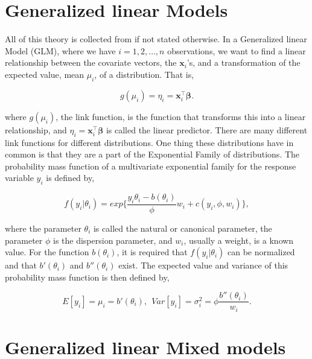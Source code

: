 
\section{Generalized linear Models}

\noindent All of this theory is collected from \cite{regression} if not stated otherwise. In a Generalized linear Model (GLM), where we have $i = 1, 2, \dots, n$ observations, we want to find a linear relationship between the covariate vectors, the $\mathbf{x}_i$'s, and a transformation of the expected value, mean $\mu_i$, of a distribution. That is,

\begin{equation}
g(\mu_i) = \eta_i = \mathbf{x}_i^\top \boldsymbol{\beta}.
\label{eqn:Link}
\end{equation}

\noindent where $g(\mu_i)$, the link function, is the function that transforms this into a linear relationship, and $\eta_i = \mathbf{x}_i^\top \boldsymbol{\beta}$ is called the linear predictor. There are many different link functions for different distributions. One thing these distributions have in common is that they are a part of the Exponential Family of distributions. The probability mass function of a multivariate exponential family for the response variable $y_i$ is defined by,

\begin{equation}
f(y_i|\theta_i) = exp\Biggl\{ \frac{y_i\theta_i - b(\theta_i)}{\phi} w_i + c(y_i,\phi,w_i) \Biggr\},
\label{eqn:ExpFam}
\end{equation}

\noindent where the parameter $\theta_i$ is called the natural or canonical parameter, the parameter $\phi$ is the dispersion parameter, and $w_i$, usually a weight, is a known value. For the function $b(\theta_i)$, it is required that $f(y_i|\theta_i)$ can be normalized and that $b'(\theta_i)$ and $b''(\theta_i)$ exist. The expected value and variance of this probability mass function is then defined by,

\begin{equation*}
E[y_i] = \mu_i = b'(\theta_i), \ \ Var[y_i] = \sigma_i^2 = \phi \frac{b''(\theta_i)}{w_i}.
\label{eqn:EV}
\end{equation*}

\section{Generalized linear Mixed models }

